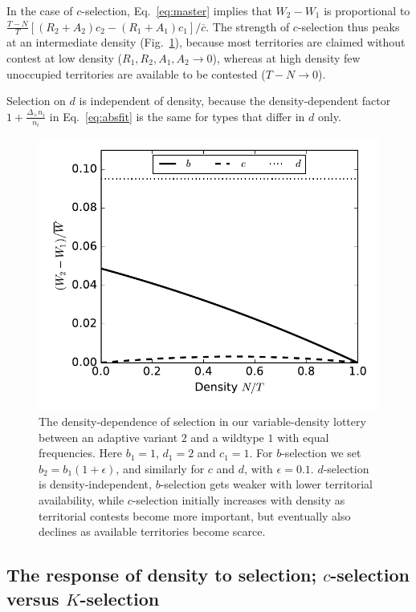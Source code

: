 \documentclass[12pt]{article}
\begin{document}
In the case of $c$-selection, Eq.~\eqref{eq:master} implies that $W_2-W_1$ is proportional to $\frac{T-N}{T} \left[(R_2+A_2)c_2-(R_1+A_1)c_1\right]/\overline{c}$. The strength of $c$-selection thus peaks at an intermediate density (Fig.~\ref{fig:DDS_lottery}), because most territories are claimed without contest at low density ($R_1,R_2,A_1,A_2\rightarrow 0$), whereas at high density few unoccupied territories are available to be contested ($T-N\rightarrow 0$). 

Selection on $d$ is independent of density, because the density-dependent factor $1 + \frac{\Delta_+ n_i}{n_i}$ in Eq.~\eqref{eq:absfit} is the same for types that differ in $d$ only.

\begin{figure}
\centering
\includegraphics[scale=0.8]{DDS_lottery.pdf}
\caption{\label{fig:DDS_lottery} The density-dependence of selection in our variable-density lottery between an adaptive variant $2$ and a wildtype $1$ with equal frequencies. Here $b_1=1$, $d_1=2$ and $c_1=1$. For $b$-selection we set $b_2=b_1(1+\epsilon)$, and similarly for $c$ and $d$, with $\epsilon=0.1$. $d$-selection is density-independent, $b$-selection gets weaker with lower territorial availability, while $c$-selection initially increases with density as territorial contests become more important, but eventually also declines as available territories become scarce.}
\end{figure}

\subsection*{The response of density to selection; $c$-selection versus $K$-selection}
\end{document}

